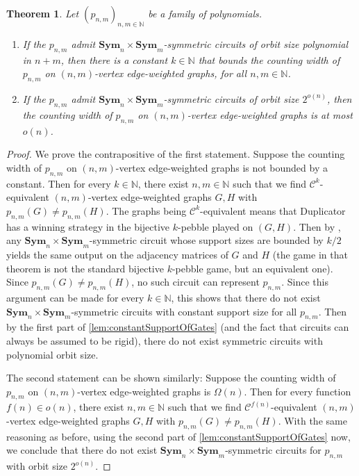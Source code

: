\documentclass[10pt,a4paper]{article}
\theoremstyle{definition}
\theoremstyle{plain}
\newtheorem{theorem}[definition]{Theorem}
\theoremstyle{remark}
\newcommand{\Sym}{\mathbf{Sym}}
\newcommand{\bbN}{\mathbb{N}}
\begin{document}
	\begin{theorem}\label{thm:counting-width}
		Let $(p_{n,m})_{n,m\in \mathbb{N}}$ be a family of polynomials.
		\begin{enumerate}
			\item If the $p_{n,m}$ admit $\Sym_n \times \Sym_m$-symmetric circuits of orbit size polynomial in $n+m$,
			then there is a constant $k \in \bbN$ that bounds the counting width of $p_{n,m}$ on $(n,m)$-vertex edge-weighted graphs, for all $n,m \in \bbN$.
			\item If the $p_{n,m}$ admit $\Sym_n \times \Sym_m$-symmetric circuits of orbit size $2^{o(n)}$, then the counting width of $p_{n,m}$ on $(n,m)$-vertex edge-weighted graphs is at most $o(n)$.
		\end{enumerate}
	\end{theorem}
	\begin{proof} 
		We prove the contrapositive of the first statement. Suppose the counting width of $p_{n,m}$ on $(n,m)$-vertex edge-weighted graphs is not bounded by a constant. Then for every $k \in \bbN$, there exist $n,m \in \bbN$ such that we find $\mathcal{C}^{k}$-equivalent $(n,m)$-vertex edge-weighted graphs $G,H$ with $p_{n,m}(G) \neq p_{n,m}(H)$.
		The graphs being $\mathcal{C}^{k}$-equivalent means that Duplicator has a winning strategy in the bijective $k$-pebble played on $(G,H)$. Then by \cite[Theorem~4.8]{dawar2021lower}, any $\Sym_n \times \Sym_m$-symmetric circuit whose support sizes are bounded by $k/2$ yields the same output on the adjacency matrices of $G$ and $H$ (the game in that theorem is not the standard bijective $k$-pebble game, but an equivalent one). Since $p_{n,m}(G) \neq p_{n,m}(H)$, no such circuit can represent $p_{n,m}$. Since this argument can be made for every $k \in \bbN$, this shows that there do not exist $\Sym_n \times \Sym_m$-symmetric circuits with constant support size for all $p_{n,m}$.
		Then by the first part of \cref{lem:constantSupportOfGates} (and the fact that circuits can always be assumed to be rigid), there do not exist symmetric circuits with polynomial orbit size.
		
		The second statement can be shown similarly: Suppose the counting width of $p_{n,m}$ on $(n,m)$-vertex edge-weighted graphs is $\Omega(n)$. Then for every function $f(n) \in o(n)$, there exist $n,m \in \bbN$ such that we find $\mathcal{C}^{f(n)}$-equivalent $(n,m)$-vertex edge-weighted graphs $G,H$ with $p_{n,m}(G) \neq p_{n,m}(H)$. With the same reasoning as before, using the second part of \cref{lem:constantSupportOfGates} now, we conclude that there do not exist $\Sym_n \times \Sym_m$-symmetric circuits for $p_{n,m}$ with orbit size $2^{o(n)}$.
	\end{proof}	
	
\end{document}
